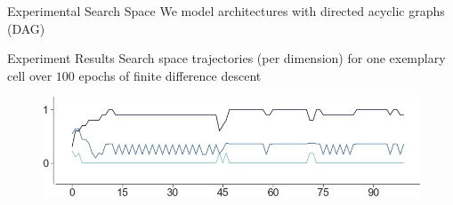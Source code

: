 \documentclass[]{beamer}
\begin{document}
\begin{frame}{Experimental Search Space}
\vspace{10pt}
We model architectures with directed acyclic graphs (DAG)
\vfill
\begin{figure}
\end{figure}
\end{frame}

\begin{frame}{Experiment Results}
\vspace{10pt}
Search space trajectories (per dimension) for one exemplary cell over $100$ epochs of finite difference descent
\vspace{10pt}
\vfill
\begin{figure}
    \begin{center}
    \includegraphics[scale=.7]{graphics/traject_f2_cell1.png}
  \end{center}
\end{figure}
\end{frame}
\end{document}
